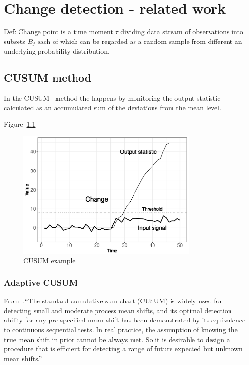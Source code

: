 \chapter{Change detection - related work}  %

Def: Change point is a time moment $\tau$ dividing data stream of observations into subsets $B_j$ each of which can be regarded as a random sample from different an underlying probability distribution.

\section{CUSUM method}
In the CUSUM~\cite{Page1954} method the \cd happens by monitoring the output statistic calculated as an accumulated sum of the deviations from the mean level.



Figure~\ref{fig:cusum_demo1}
\begin{figure}
    \centering
        \includegraphics[width=0.8\textwidth]{./img/cusum_demo1.pdf}
    \caption{CUSUM example}
    \label{fig:cusum_demo1}
\end{figure}

\subsection{Adaptive CUSUM}
From~\cite{luo2009adaptive}:``The standard cumulative sum chart
(CUSUM) is widely used for detecting small and moderate process
mean shifts, and its optimal detection ability for any
pre-specified mean shift has been demonstrated by its equivalence
to continuous sequential tests. In real practice, the assumption
of knowing the true mean shift in prior cannot be always met. So
it is desirable to design a procedure that is efficient for
detecting a range of future expected but unknown mean shifts.''

